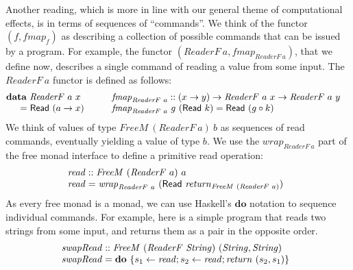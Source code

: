 \documentclass{jfp1}
\newcommand{\kw}[1]{\textbf{#1}}
\begin{document}
Another reading, which is more in line with our general theme of
computational effects, is in terms of sequences of ``commands''. We
think of the functor $(f, \mathit{fmap}_f)$ as describing a collection
of possible commands that can be issued by a program. For example, the
functor $(\mathit{ReaderF}~a, \mathit{fmap}_{\mathit{ReaderF}~a})$,
that we define now, describes a single command of reading a value from
some input. The $\mathit{ReaderF}~a$ functor is defined as follows:
\begin{displaymath}
  \begin{array}{@{}l@{\hspace{2em}}l}
    \begin{array}{@{}l}
      \kw{data}~\mathit{ReaderF}~a~x \\
      \quad
      \begin{array}{c@{\hspace{0.3em}}l}
        = & \mathsf{Read}~(a \to x)
      \end{array}
    \end{array}
    &
    \begin{array}{@{}l}
      \mathit{fmap}_{\mathit{ReaderF}~a} :: (x \to y) \to \mathit{ReaderF}~a~x \to \mathit{ReaderF}~a~y \\
      \mathit{fmap}_{\mathit{ReaderF}~a}~g~(\mathsf{Read}~k) = \mathsf{Read}~(g \circ k)
    \end{array}
  \end{array}
\end{displaymath}
We think of values of type $\mathit{FreeM}~(\mathit{ReaderF}~a)~b$ as
sequences of read commands, eventually yielding a value of type
$b$. We use the $\mathit{wrap}_{\mathit{ReaderF}~a}$ part of the free
monad interface to define a primitive read operation:
\begin{displaymath}
  \begin{array}{@{}l}
    \mathit{read} :: \mathit{FreeM}~(\mathit{ReaderF}~a)~a \\
    \mathit{read} = \mathit{wrap}_{\mathit{ReaderF}~a}~(\mathsf{Read}~\mathit{return}_{\mathit{FreeM}~(\mathit{ReaderF}~a)})
  \end{array}
\end{displaymath}
As every free monad is a monad, we can use Haskell's $\kw{do}$
notation to sequence individual commands. For example, here is a
simple program that reads two strings from some input, and returns
them as a pair in the opposite order.
\begin{displaymath}
  \begin{array}{@{}l}
  \mathit{swapRead} :: \mathit{FreeM}~(\mathit{ReaderF}~\mathit{String})~(\mathit{String},\mathit{String}) \\
  \mathit{swapRead} = \kw{do}~\{ s_1 \leftarrow \mathit{read}; s_2 \leftarrow \mathit{read}; \mathit{return}~(s_2,s_1) \}
\end{array}
\end{displaymath}
\end{document}
